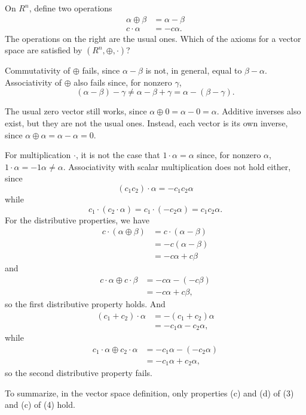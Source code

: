  On $R^n$, define two operations
\begin{align*}
  \alpha \oplus \beta &= \alpha - \beta \\
  c\cdot\alpha &= -c\alpha.
\end{align*}
The operations on the right are the usual ones. Which of the axioms
for a vector space are satisfied by $(R^n,\oplus,\cdot)$?
\begin{solution}
  Commutativity of $\oplus$ fails, since $\alpha - \beta$ is not, in
  general, equal to $\beta - \alpha$. Associativity of $\oplus$ also
  fails since, for nonzero $\gamma$,
  \begin{equation*}
    (\alpha - \beta) - \gamma
    \neq \alpha - \beta + \gamma
    = \alpha - (\beta - \gamma).
  \end{equation*}

  The usual zero vector still works, since
  $\alpha\oplus0 = \alpha - 0 = \alpha$. Additive inverses also exist,
  but they are not the usual ones. Instead, each vector is its own
  inverse, since $\alpha\oplus\alpha = \alpha - \alpha = 0$.

  For multiplication $\cdot$, it is not the case that
  $1\cdot\alpha = \alpha$ since, for nonzero $\alpha$,
  $1\cdot\alpha = -1\alpha \neq \alpha$. Associativity with scalar
  multiplication does not hold either, since
  \begin{equation*}
    (c_1c_2)\cdot\alpha
    = -c_1c_2\alpha
  \end{equation*}
  while
  \begin{equation*}
    c_1\cdot(c_2\cdot\alpha)
    = c_1\cdot(-c_2\alpha)
    = c_1c_2\alpha.
  \end{equation*}
  For the distributive properties, we have
  \begin{align*}
    c\cdot(\alpha\oplus\beta)
    &= c\cdot(\alpha - \beta) \\
    &= -c(\alpha - \beta) \\
    &= -c\alpha + c\beta
  \end{align*}
  and
  \begin{align*}
    c\cdot\alpha\oplus c\cdot\beta
    &= -c\alpha - (-c\beta) \\
    &= -c\alpha + c\beta,
  \end{align*}
  so the first distributive property holds. And
  \begin{align*}
    (c_1 + c_2)\cdot\alpha
    &= -(c_1 + c_2)\alpha \\
    &= -c_1\alpha - c_2\alpha,
  \end{align*}
  while
  \begin{align*}
    c_1\cdot\alpha \oplus c_2\cdot\alpha
    &= -c_1\alpha - (-c_2\alpha) \\
    &= -c_1\alpha + c_2\alpha,
  \end{align*}
  so the second distributive property fails.

  To summarize, in the vector space definition, only properties (c)
  and (d) of (3) and (c) of (4) hold.
\end{solution}
